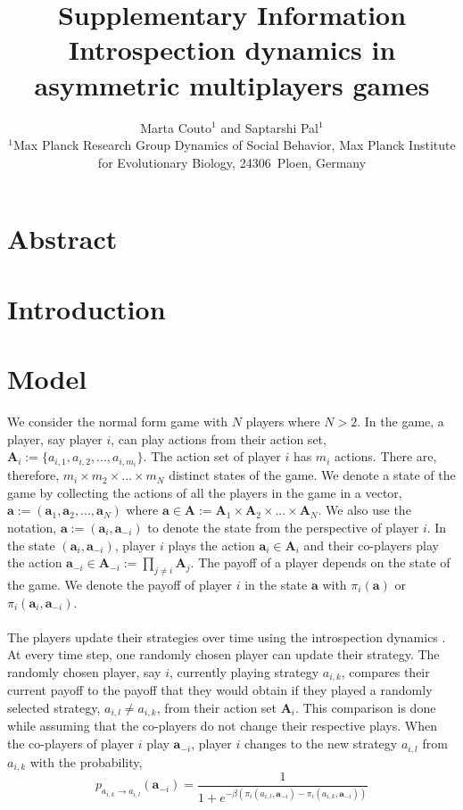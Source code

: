 \documentclass[11pt]{article}
\title{\sffamily \Large Supplementary Information\\[0.1cm] {\bfseries Introspection dynamics in asymmetric multiplayers games}}
\date{\empty}
\author{\parbox[c]{16cm}{\centering \onehalfspacing \fontsize{11}{12}\selectfont Marta Couto$^1$ and Saptarshi Pal$^1$\\[0.2cm]
$^1$Max Planck Research Group Dynamics of Social Behavior, Max Planck Institute for Evolutionary Biology, 24306~Ploen, Germany}}
\theoremstyle{plainCl1}
\theoremstyle{plainCl2}
\newcommand{\A}{\mathbf{A}}
\newcommand{\abf}{\mathbf{a}}
\begin{document}
\maketitle
\onehalfspacing
\section*{Abstract}
\newpage
\section*{Introduction}
\section*{Model}
We consider the normal form game with $N$ players where $N > 2$. In the game, a player, say player $i$, can play actions from their action set, $\A_i := \{a_{i,1}, a_{i,2}, ..., a_{i,m_i} \}$. The action set of player $i$ has $m_i$ actions. There are, therefore, $m_i \times m_2 \times ... \times m_N$ distinct states of the game. We denote a state of the game by collecting the actions of all the players in the game in a vector, $\abf := (\abf_1, \abf_2, ..., \abf_N)$ where $\abf \in \A := \A_1 \times \A_2 \times ... \times \A_N$. We also use the notation, $\abf := (\abf_i, \abf_{-i})$ to denote the state from the perspective of player $i$. In the state $(\abf_i, \abf_{-i})$, player $i$ plays the action $\abf_i \in \A_i$ and their co-players play the action $\abf_{-i} \in \A_{-i} := \prod_{j \neq i} \A_j$. The payoff of a player depends on the state of the game. We denote the payoff of player $i$ in the state $\abf$ with $\pi_i(\abf)$ or $\pi_i(\abf_i, \abf_{-i})$. \\ \\ 
\noindent The players update their strategies over time using the introspection dynamics \cite{couto2022introspection}. At every time step, one randomly chosen player can update their strategy. The randomly chosen player, say $i$, currently playing strategy $a_{i,k}$, compares their current payoff to the payoff that they would obtain if they played a randomly selected strategy,  $a_{i,l} \neq a_{i,k}$, from their action set $\A_i$. This comparison is done while assuming that the co-players do not change their respective plays. When the co-players of player $i$ play $\abf_{-i}$, player $i$ changes to the new strategy $a_{i,l}$ from $a_{i,k}$ with the probability, \\
\begin{equation}
 p_{a_{i,k} \to a_{i,l}} (\abf_{-i})= \frac{1}{1 + e^{\displaystyle -\beta(\pi_i(a_{i,l}, \abf_{-i}) - \pi_i(a_{i,k}, \abf_{-i}))}}
 \label{Eq:introspection-update}
\end{equation}
\end{document}

